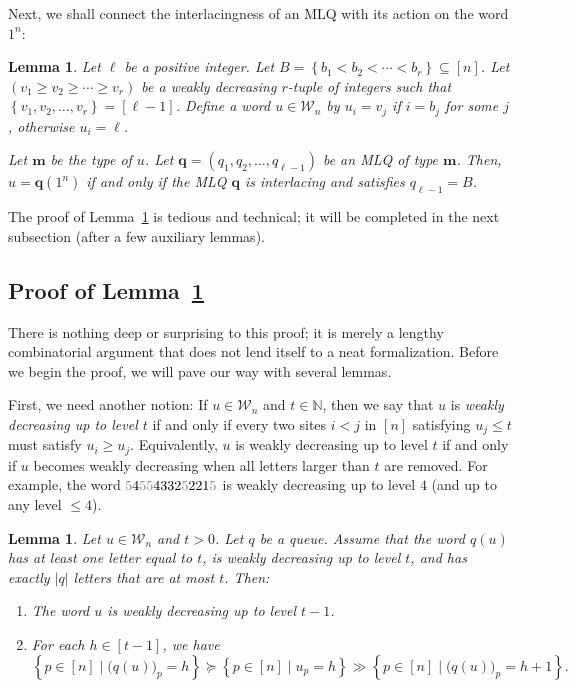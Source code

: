 \documentclass[reqno]{amsart}
\newcommand{\0}{\phantom{c}}
\newcommand{\mm}{\mathbf{m}}
\newcommand{\qq}{\mathbf{q}}
\newcommand{\mcW}{\mathcal{W}}
\newcommand{\NN}{\mathbb{N}}
\newcommand{\set}[1]{\left\{ #1 \right\}}
\newcommand{\abs}[1]{\left| #1 \right|}
\newcommand{\tup}[1]{\left( #1 \right)}
\newcommand{\ive}[1]{\left[ #1 \right]}
\newcommand{\defn}[1]{{\color{darkred}\emph{#1}}} %
\theoremstyle{plain}
\newtheorem{lemma}[thm]{Lemma}
\theoremstyle{definition}
\numberwithin{equation}{section}
\newcommand{\Darij}[1]{\todo[size=\tiny,inline,color=red!30]{#1
      \\ \hfill --- Darij}}
\begin{document}
Next, we shall connect the interlacingness of an MLQ with its action on the word $1^n$:

\begin{lemma}
\label{lem:determinant_form.interl-act}
Let $\ell$ be a positive integer.
Let $B = \set{ b_1 < b_2 < \cdots < b_r }  \subseteq \ive{n}$.
Let $\left( v_1 \geq v_2 \geq \dotsm \geq v_r \right)$ be a weakly decreasing $r$-tuple of integers such that $\set{ v_1, v_2, \dotsc, v_r } = \ive{\ell-1}$.
Define a word $u \in \mcW_n$ by $u_i = v_j$ if $i = b_j$ for some $j$, otherwise $u_i = \ell$.

Let $\mm$ be the type of $u$.
Let $\qq = \tup{q_1, q_2, \dotsc, q_{\ell-1}}$ be an MLQ of type $\mm$.
Then, $u = \qq(1^n)$ if and only if the MLQ $\qq$ is interlacing and satisfies $q_{\ell-1} = B$.
\end{lemma}

\Darij{TODO: Example.}

The proof of Lemma~\ref{lem:determinant_form.interl-act} is tedious and technical; it will be completed in the next subsection (after a few auxiliary lemmas).

\subsection{Proof of Lemma~\ref{lem:determinant_form.interl-act}}

There is nothing deep or surprising to this proof; it is merely a lengthy combinatorial argument that does not lend itself to a neat formalization.
Before we begin the proof, we will pave our way with several lemmas.

First, we need another notion:
If $u \in \mcW_n$ and $t \in \NN$, then we say that $u$ is \defn{weakly decreasing up to level $t$} if and only if every two sites $i < j$ in $\ive{n}$ satisfying $u_j \leq t$ must satisfy $u_i \geq u_j$.
Equivalently, $u$ is weakly decreasing up to level $t$ if and only if $u$ becomes weakly decreasing when all letters larger than $t$ are removed.
For example, the word ${\color{gray}5}4{\color{gray}55}4332{\color{gray}5}221{\color{gray}5}$ is weakly decreasing up to level $4$ (and up to any level $\leq 4$).

\begin{lemma}
\label{lem:determinant_form.interl-A}
Let $u \in \mcW_n$ and $t > 0$.
Let $q$ be a queue.
Assume that the word $q(u)$ has at least one letter equal to $t$, is weakly decreasing up to level $t$, and has exactly $\abs{q}$ letters that are at most $t$.
Then:

\begin{enumerate}
\item[(a)] The word $u$ is weakly decreasing up to level $t-1$.

\item[(b)] For each $h \in \ive{t-1}$, we have
\[
\set{ p \in \ive{n} \mid \bigl( q(u) \bigr)_p = h }
\succeq
\set{ p \in \ive{n} \mid u_p = h }
\gg
\set{ p \in \ive{n} \mid \bigl( q(u) \bigr)_p = h+1 } .
\]
\end{enumerate}
\end{lemma}
\end{document}
